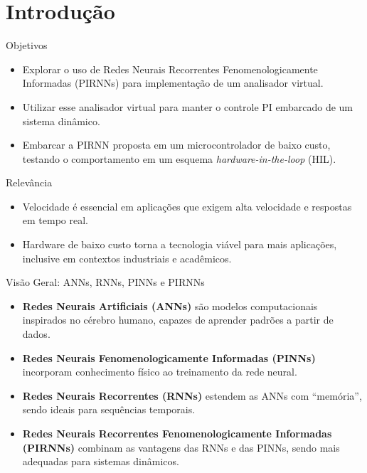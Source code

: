 \section{Introdução}

\begin{frame}
  \begin{block}{Objetivos}
    \begin{itemize}
      \item Explorar o uso de Redes Neurais Recorrentes Fenomenologicamente Informadas (PIRNNs) para implementação de um analisador virtual.
      \item Utilizar esse analisador virtual para manter o controle PI embarcado de um sistema dinâmico.
      \item Embarcar a PIRNN proposta em um microcontrolador de baixo custo, testando o comportamento em um esquema \textit{hardware-in-the-loop} (HIL).
    \end{itemize}
  \end{block}

  \begin{block}{Relevância}
    \begin{itemize}
      \item Velocidade é essencial em aplicações que exigem alta velocidade e respostas em tempo real.
      \item Hardware de baixo custo torna a tecnologia viável para mais aplicações, inclusive em contextos industriais e acadêmicos.
    \end{itemize}
  \end{block}
\end{frame}

\begin{frame}{Visão Geral: ANNs, RNNs, PINNs e PIRNNs}
  \begin{itemize}
    \item \textbf{Redes Neurais Artificiais (ANNs)} são modelos computacionais inspirados no cérebro humano, capazes de aprender padrões a partir de dados. \vspace{0.5em}

    \item \textbf{Redes Neurais Fenomenologicamente Informadas (PINNs)} incorporam conhecimento físico ao treinamento da rede neural. \vspace{0.5em}

    \item \textbf{Redes Neurais Recorrentes (RNNs)} estendem as ANNs com “memória”, sendo ideais para sequências temporais. \vspace{0.5em}

    \item \textbf{Redes Neurais Recorrentes Fenomenologicamente Informadas (PIRNNs)} combinam as vantagens das RNNs e das PINNs, sendo mais adequadas para sistemas dinâmicos.
  \end{itemize}
\end{frame}

